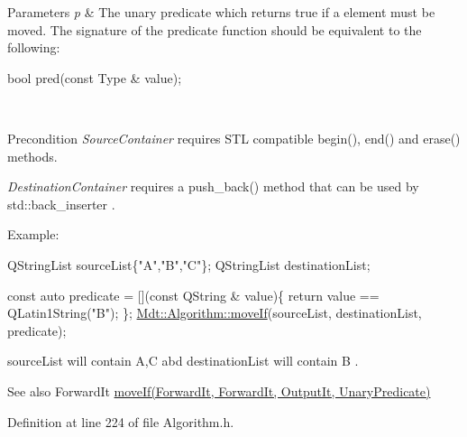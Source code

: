\begin{DoxyParams}{Parameters}
{\em p} & The unary predicate which returns true if a element must be moved. The signature of the predicate function should be equivalent to the following\+: 
\begin{DoxyCode}
\textcolor{keywordtype}{bool} pred(\textcolor{keyword}{const} Type & value);
\end{DoxyCode}
 \\
\hline
\end{DoxyParams}
\begin{DoxyPrecond}{Precondition}
{\itshape Source\+Container} requires S\+TL compatible begin(), end() and erase() methods. 

{\itshape Destination\+Container} requires a push\+\_\+back() method that can be used by std\+::back\+\_\+inserter .
\end{DoxyPrecond}
Example\+: 
\begin{DoxyCode}
QStringList sourceList\{\textcolor{stringliteral}{"A"},\textcolor{stringliteral}{"B"},\textcolor{stringliteral}{"C"}\};
QStringList destinationList;

\textcolor{keyword}{const} \textcolor{keyword}{auto} predicate = [](\textcolor{keyword}{const} QString & value)\{
  \textcolor{keywordflow}{return} value == QLatin1String(\textcolor{stringliteral}{"B"});
\};
\hyperlink{namespace_mdt_1_1_algorithm_a1f739be25cc7de2c30a21b85d9b25f0a}{Mdt::Algorithm::moveIf}(sourceList, destinationList, predicate);
\end{DoxyCode}
 source\+List will contain A,C abd destination\+List will contain B .

\begin{DoxySeeAlso}{See also}
Forward\+It \hyperlink{namespace_mdt_1_1_algorithm_a1f739be25cc7de2c30a21b85d9b25f0a}{move\+If(\+Forward\+It, Forward\+It, Output\+It, Unary\+Predicate)} 
\end{DoxySeeAlso}


Definition at line 224 of file Algorithm.\+h.

